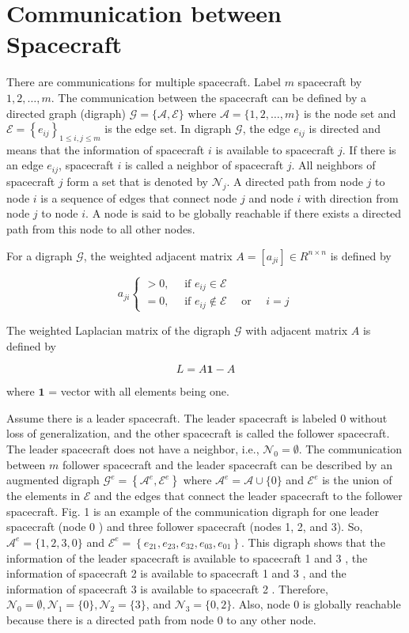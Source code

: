 \documentclass[10pt]{article}
\begin{document}
\section{Communication between Spacecraft}
There are communications for multiple spacecraft. Label $m$ spacecraft by $1,2, \ldots, m$. The communication between the spacecraft can be defined by a directed graph (digraph) $\mathcal{G}=\{\mathcal{A}, \mathcal{E}\}$ where $\mathcal{A}=\{1,2, \ldots, m\}$ is the node set and $\mathcal{E}=\left\{e_{i j}\right\}_{1 \leq i, j \leq m}$ is the edge set. In digraph $\mathcal{G}$, the edge $e_{i j}$ is directed and means that the information of spacecraft $i$ is available to spacecraft $j$. If there is an edge $e_{i j}$, spacecraft $i$ is called a neighbor of spacecraft $j$. All neighbors of spacecraft $j$ form a set that is denoted by $\mathcal{N}_{j}$. A directed path from node $j$ to node $i$ is a sequence of edges that connect node $j$ and node $i$ with direction from node $j$ to node $i$. A node is said to be globally reachable if there exists a directed path from this node to all other nodes.

For a digraph $\mathcal{G}$, the weighted adjacent matrix $A=\left[a_{j i}\right] \in R^{n \times n}$ is defined by

$$
a_{j i}\left\{\begin{array}{l}
>0, \quad \text { if } e_{i j} \in \mathcal{E} \\
=0, \quad \text { if } e_{i j} \notin \mathcal{E} \quad \text { or } \quad i=j
\end{array}\right.
$$

The weighted Laplacian matrix of the digraph $\mathcal{G}$ with adjacent matrix $A$ is defined by

$$
L=A \mathbf{1}-A
$$

where $\mathbf{1}$ = vector with all elements being one.

Assume there is a leader spacecraft. The leader spacecraft is labeled 0 without loss of generalization, and the other spacecraft is called the follower spacecraft. The leader spacecraft does not have a neighbor, i.e., $\mathcal{N}_{0}=\emptyset$. The communication between $m$ follower spacecraft and the leader spacecraft can be described by an augmented digraph $\mathcal{G}^{e}=\left\{\mathcal{A}^{e}, \mathcal{E}^{e}\right\}$ where $\mathcal{A}^{e}=\mathcal{A} \cup\{0\}$ and $\mathcal{E}^{e}$ is the union of the elements in $\mathcal{E}$ and the edges that connect the leader spacecraft to the follower spacecraft. Fig. 1 is an example of the communication digraph for one leader spacecraft (node 0 ) and three follower spacecraft (nodes 1, 2, and 3). So, $\mathcal{A}^{e}=\{1,2,3,0\}$ and $\mathcal{E}^{e}=\left\{e_{21}, e_{23}, e_{32}, e_{03}, e_{01}\right\}$. This digraph shows that the information of the leader spacecraft is available to spacecraft 1 and 3 , the information of spacecraft 2 is available to spacecraft 1 and 3 , and the information of spacecraft 3 is available to spacecraft 2 . Therefore, $\mathcal{N}_{0}=\emptyset, \mathcal{N}_{1}=\{0\}, \mathcal{N}_{2}=\{3\}$, and $\mathcal{N}_{3}=\{0,2\}$. Also, node 0 is globally reachable because there is a directed path from node 0 to any other node.
\end{document}
